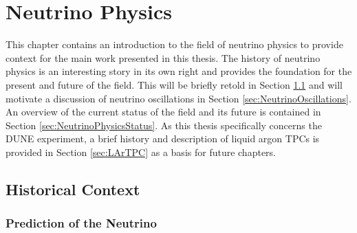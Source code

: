 
\graphicspath{{NeutrinoPhysics/Figs/}}

\chapter{Neutrino Physics}\label{chap:NeutrinoPhysics}

This chapter contains an introduction to the field of neutrino physics to provide context for the main work presented in this thesis.  The history of neutrino physics is an interesting story in its own right and provides the foundation for the present and future of the field.  This will be briefly retold in Section \ref{sec:HistoricalContext} and will motivate a discussion of neutrino oscillations in Section \ref{sec:NeutrinoOscillations}.  An overview of the current status of the field and its future is contained in Section \ref{sec:NeutrinoPhysicsStatus}.  As this thesis specifically concerns the DUNE experiment, a brief history and description of liquid argon TPCs is provided in Section \ref{sec:LArTPC} as a basis for future chapters.

\section{Historical Context}\label{sec:HistoricalContext}

\subsection{Prediction of the Neutrino}\label{NeutrinoPrediction}

